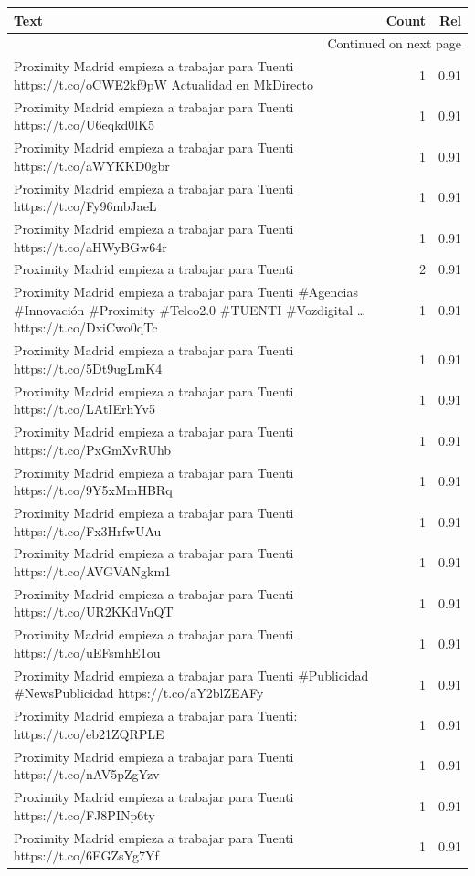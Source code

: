 \begin{longtable}{p{12.5cm}rr}
\toprule
Text & Count & Rel \\
\midrule
\endhead
\midrule
\multicolumn{3}{r}{{Continued on next page}} \\
\midrule
\endfoot

\bottomrule
\endlastfoot
Proximity Madrid empieza a trabajar para Tuenti https://t.co/oCWE2kf9pW Actualidad en MkDirecto & 1 & 0.91 \\
Proximity Madrid empieza a trabajar para Tuenti https://t.co/U6eqkd0lK5 & 1 & 0.91 \\
Proximity Madrid empieza a trabajar para Tuenti https://t.co/aWYKKD0gbr & 1 & 0.91 \\
Proximity Madrid empieza a trabajar para Tuenti https://t.co/Fy96mbJaeL & 1 & 0.91 \\
Proximity Madrid empieza a trabajar para Tuenti https://t.co/aHWyBGw64r & 1 & 0.91 \\
Proximity Madrid empieza a trabajar para Tuenti & 2 & 0.91 \\
Proximity Madrid empieza a trabajar para Tuenti \#Agencias \#Innovación \#Proximity \#Telco2.0 \#TUENTI \#Vozdigital    … https://t.co/DxiCwo0qTc & 1 & 0.91 \\
Proximity Madrid empieza a trabajar para Tuenti https://t.co/5Dt9ugLmK4 & 1 & 0.91 \\
Proximity Madrid empieza a trabajar para Tuenti https://t.co/LAtIErhYv5 & 1 & 0.91 \\
Proximity Madrid empieza a trabajar para Tuenti https://t.co/PxGmXvRUhb & 1 & 0.91 \\
Proximity Madrid empieza a trabajar para Tuenti https://t.co/9Y5xMmHBRq & 1 & 0.91 \\
Proximity Madrid empieza a trabajar para Tuenti https://t.co/Fx3HrfwUAu & 1 & 0.91 \\
Proximity Madrid empieza a trabajar para Tuenti https://t.co/AVGVANgkm1 & 1 & 0.91 \\
Proximity Madrid empieza a trabajar para Tuenti https://t.co/UR2KKdVnQT & 1 & 0.91 \\
Proximity Madrid empieza a trabajar para Tuenti https://t.co/uEFsmhE1ou & 1 & 0.91 \\
Proximity Madrid empieza a trabajar para Tuenti \#Publicidad \#NewsPublicidad https://t.co/aY2blZEAFy & 1 & 0.91 \\
Proximity Madrid empieza a trabajar para Tuenti: https://t.co/eb21ZQRPLE & 1 & 0.91 \\
Proximity Madrid empieza a trabajar para Tuenti https://t.co/nAV5pZgYzv & 1 & 0.91 \\
Proximity Madrid empieza a trabajar para Tuenti https://t.co/FJ8PINp6ty & 1 & 0.91 \\
Proximity Madrid empieza a trabajar para Tuenti https://t.co/6EGZsYg7Yf & 1 & 0.91 \\

\end{longtable}
\clearpage

